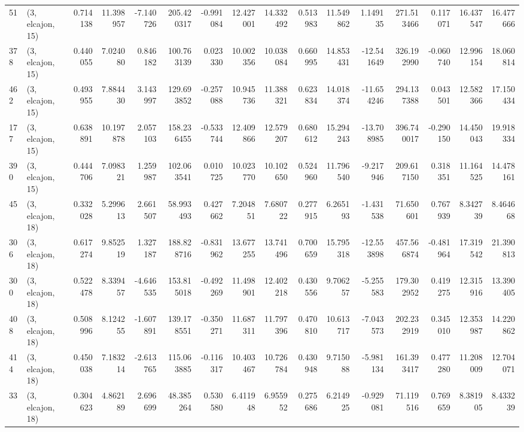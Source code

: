 \begin{tabular}{llrrrrrrrrrrrrrr}
51  &  (3, elcajon, 15) &   0.714138 &  11.398957 &  -7.140726 &   205.420317 &  -0.991084 &  12.427001 &  14.332492 &  0.513983 &  11.549862 &   1.149135 &   271.513466 &  0.117071 &  16.437547 &  16.477666 \\
378 &  (3, elcajon, 15) &   0.440055 &   7.024080 &   0.846182 &   100.763139 &   0.023330 &  10.002356 &  10.038084 &  0.660995 &  14.853431 & -12.541649 &   326.192990 & -0.060740 &  12.996154 &  18.060814 \\
462 &  (3, elcajon, 15) &   0.493955 &   7.884430 &   3.143997 &   129.693852 &  -0.257088 &  10.945736 &  11.388321 &  0.623834 &  14.018374 & -11.654246 &   294.137388 &  0.043501 &  12.582366 &  17.150434 \\
177 &  (3, elcajon, 15) &   0.638891 &  10.197878 &   2.057103 &   158.236455 &  -0.533744 &  12.409866 &  12.579207 &  0.680612 &  15.294243 & -13.708985 &   396.740017 & -0.290150 &  14.450043 &  19.918334 \\
390 &  (3, elcajon, 15) &   0.444706 &   7.098321 &   1.259987 &   102.063541 &   0.010725 &  10.023770 &  10.102650 &  0.524960 &  11.796540 &  -9.217946 &   209.617150 &  0.318351 &  11.164525 &  14.478161 \\
45  &  (3, elcajon, 18) &   0.332028 &   5.299613 &   2.661507 &    58.993493 &   0.427662 &   7.204851 &   7.680722 &  0.277915 &   6.265193 &  -1.431538 &    71.650601 &  0.767939 &   8.342739 &   8.464668 \\
306 &  (3, elcajon, 18) &   0.617274 &   9.852519 &   1.327187 &   188.828716 &  -0.831962 &  13.677255 &  13.741496 &  0.700659 &  15.795318 & -12.553898 &   457.566874 & -0.481964 &  17.319542 &  21.390813 \\
300 &  (3, elcajon, 18) &   0.522478 &   8.339457 &  -4.646535 &   153.815018 &  -0.492269 &  11.498901 &  12.402218 &  0.430556 &   9.706257 &  -5.255583 &   179.302952 &  0.419275 &  12.315916 &  13.390405 \\
408 &  (3, elcajon, 18) &   0.508996 &   8.124255 &  -1.607891 &   139.178551 &  -0.350271 &  11.687311 &  11.797396 &  0.470810 &  10.613717 &  -7.043573 &   202.232919 &  0.345010 &  12.353987 &  14.220862 \\
414 &  (3, elcajon, 18) &   0.450038 &   7.183214 &  -2.613765 &   115.063885 &  -0.116317 &  10.403467 &  10.726784 &  0.430948 &   9.715088 &  -5.981134 &   161.393417 &  0.477280 &  11.208009 &  12.704071 \\
33  &  (3, elcajon, 18) &   0.304623 &   4.862189 &   2.696699 &    48.385264 &   0.530580 &   6.411948 &   6.955952 &  0.275686 &   6.214925 &  -0.929081 &    71.119516 &  0.769659 &   8.381905 &   8.433239 \\

\end{tabular}
